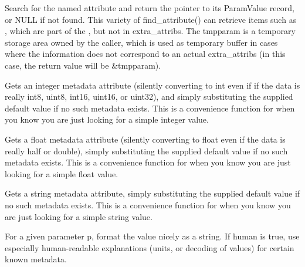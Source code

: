 Search for the named attribute and return the pointer to its
{\cf ParamValue} record, or {\cf NULL} if not found.  This variety of
{\cf find_attribute(}) can retrieve items such as , which are
part of the \ImageSpec, but not in {\cf extra_attribs}. The {\cf tmpparam}
is a temporary storage area owned by the caller, which is used as temporary
buffer in cases where the information does not correspond to an actual
{\cf extra_attribs} (in this case, the return value will be {\cf \&tmpparam}).
\apiend

Gets an integer metadata attribute (silently converting to {\cf int}
even if if the data is really int8, uint8, int16, uint16, or uint32),
and simply substituting the supplied default value if no such metadata
exists.  This is a convenience function for when you know you are just
looking for a simple integer value.
\apiend

Gets a float metadata attribute (silently converting to {\cf float} even
if the data is really half or double), simply substituting the supplied
default value if no such metadata exists.  This is a convenience
function for when you know you are just looking for a simple float value.
\apiend

Gets a string metadata attribute, simply substituting the supplied
default value if no such metadata exists.  This is a convenience
function for when you know you are just looking for a simple string value.
\apiend


For a given parameter {\cf p}, format the value nicely as a string.
If {\cf human} is true, use
especially human-readable explanations (units, or decoding of
values) for certain known metadata.
\apiend


